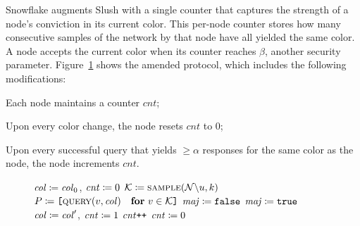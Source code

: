 \documentclass[letterpaper,twocolumn,10pt]{article}
\theoremstyle{definition}
\begin{document}
Snowflake augments Slush with a single counter that captures the strength of a node's conviction in its current color.
This per-node counter stores how many consecutive samples of the network by that node have all yielded the same color.
A node accepts the current color when its counter reaches $\beta$, another security parameter.
Figure~\ref{fig:snowflake-loop} shows the amended protocol, which includes
the following modifications:

\begin{compactenum}
	\item Each node maintains a counter $\mathit{cnt}$;
    \item Upon every color change, the node resets $\mathit{cnt}$ to 0;
    \item Upon every successful query that yields $\ge \alpha$ responses for the same color as the node, the node increments $\mathit{cnt}$.
\end{compactenum}

\newcommand{\codemaj}{\mathit{maj}}
\newcommand{\codefalse}{\texttt{false}}
\newcommand{\codetrue}{\texttt{true}}
\begin{figure}
    \small
\begin{algorithmic}[1]
        \State $\mathit{col} \coloneqq \mathit{col}_0$, $\mathit{cnt} \coloneqq 0$
            \If{$\codecolor = \bot$}
                \Continue
            \EndIf
            \State $\mathcal{K} \assign \Call{sample}{\mathcal{N}\backslash u, k}$
            \State $P \assign \texttt{[}\Call{query}{v, \codecolor}\quad\textbf{for}\ v \in \mathcal{K}\texttt{]}$
            \State $\codemaj \assign \codefalse$
                \State $\codemaj \assign \codetrue$
                    \State $\mathit{col} \coloneqq \mathit{col}'$, $\mathit{cnt} \coloneqq 1$
                \Else\hspace{1ex}$\mathit{cnt}\texttt{++}$
                \EndIf
                \IIf {$\codecount \ge \beta$} 
            \EndIf
            \EndFor
            \IIf{$\codemaj = \codefalse$} $\mathit{cnt} \coloneqq 0$
        \EndWhile
    \EndProcedure
    \label{fig:snowflake-loop}
\end{algorithmic}
\end{figure}
\end{document}
